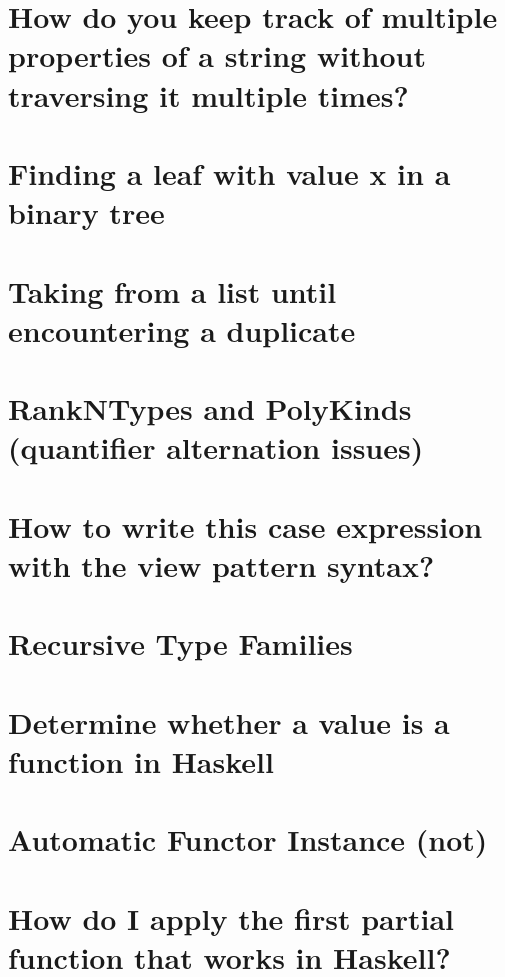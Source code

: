 \documentclass{book}
\begin{document}
\section{How do you keep track of multiple properties of a string without traversing it multiple times?}


\section{Finding a leaf with value x in a binary tree}


\section{Taking from a list until encountering a duplicate}


\section{RankNTypes and PolyKinds (quantifier alternation issues)}


\section{How to write this case expression with the view pattern syntax?}


\section{Recursive Type Families}


\section{Determine whether a value is a function in Haskell}


\section{Automatic Functor Instance (not)}


\section{How do I apply the first partial function that works in Haskell?}

\end{document}
